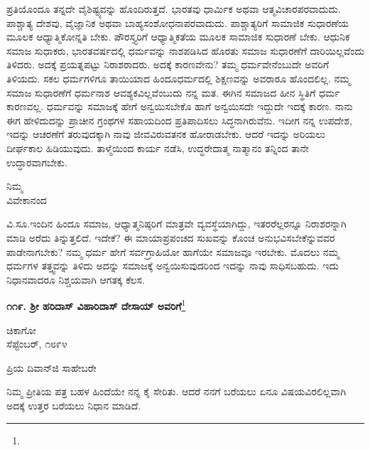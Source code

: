 ಪ್ರತಿಯೊಂದೂ ತನ್ನದೇ ವೈಶಿಷ್ಟ್ಯವನ್ನು ಹೊಂದಿರುತ್ತದೆ. ಭಾರತವು ಧಾರ್ಮಿಕ ಅಥವಾ ಆತ್ಮವಿಚಾರಪರವಾದುದು. ಪಾಶ್ಚಾತ್ಯ ದೇಶವು, ವೈಜ್ಞಾನಿಕ ಅಥವಾ ಬಾಹ್ಯಸಂಶೋಧನಾಪರವಾದುದು. ಪಾಶ್ಚಾತ್ಯರಿಗೆ ಸಾಮಾಜಿಕ ಸುಧಾರಣೆಯ ಮೂಲಕ ಆಧ್ಯಾತ್ಮಿ\break ಕೋನ್ನತಿ ಬೇಕು. ಪೌರಸ್ತ್ಯರಿಗೆ ಆಧ್ಯಾತ್ಮಿಕತೆಯ ಮೂಲಕ ಸಾಮಾಜಿಕ ಸುಧಾರಣೆ ಬೇಕು. ಆಧುನಿಕ ಸಮಾಜ ಸುಧಾಕರು, ಭಾರತವರ್ಷದಲ್ಲಿ ಧರ್ಮವನ್ನು ನಾಶಪಡಿಸಿದ ಹೊರತು ಸಮಾಜ ಸುಧಾರಣೆಗೆ ದಾರಿಯಿಲ್ಲವೆಂದು ತಿಳಿದರು. ಅದಕ್ಕೆ ಪ್ರಯತ್ನಪಟ್ಟು ನಿರಾಶರಾದರು. ಅದಕ್ಕೆ ಕಾರಣವೇನು? ತಮ್ಮ ಧರ್ಮವೇನೆಂಬುದೇ ಅವರಿಗೆ ತಿಳಿಯದು. ಸಕಲ ಧರ್ಮಗಳಿಗೂ ತಾಯಿಯಾದ ಹಿಂದೂಧರ್ಮದಲ್ಲಿ ಶಿಕ್ಷಣವನ್ನು ಅವರಾರೂ ಹೊಂದಲಿಲ್ಲ. ನಮ್ಮ ಸಮಾಜ ಸುಧಾರಣೆಗೆ ಧರ್ಮನಾಶ ಆವಶ್ಯಕವಿಲ್ಲವೆಂಬುದು ನನ್ನ ಮತ. ಈಗಿನ ಸಮಾಜದ ಹೀನ ಸ್ಥಿತಿಗೆ ಧರ್ಮ ಕಾರಣವಲ್ಲ. ಧರ್ಮವನ್ನು ಸಮಾಜಕ್ಕೆ ಹೇಗೆ ಅನ್ವಯಿಸಬೇಕೊ ಹಾಗೆ ಅನ್ವಯಿಸದೇ ಇದ್ದುದೇ ಇದಕ್ಕೆ ಕಾರಣ. ನಾನು ಈಗ ಹೇಳಿದುದನ್ನು ಪ್ರಾಚೀನ ಗ್ರಂಥಗಳ ಸಹಾಯದಿಂದ ಪ್ರತಿಪಾದಿಸಲು ಸಿದ್ಧನಾಗಿರುವೆನು. ಇದೀಗ ನನ್ನ ಉಪದೇಶ, ಇದನ್ನು ಆಚರಣೆಗೆ ತರುವುದಕ್ಕಾಗಿ ನಾವು ಜೀವವಿರುವತನಕ ಹೋರಾಡಬೇಕು. ಆದರೆ ಇದನ್ನು ಅರಿಯಲು ದೀರ್ಘಕಾಲ ಹಿಡಿಯುವುದು. ತಾಳ್ಮೆಯಿಂದ ಕಾರ್ಯ ನಡೆಸಿ, ಉದ್ಧರೇದಾತ್ಮ ನಾತ್ಮಾನಂ ತನ್ನಿಂದ ತಾನೇ ಉದ್ಧಾರವಾಗಬೇಕು.

\vspace{-0.5cm}

{\flushright
ನಿಮ್ಮ\\ವಿವೇಕಾನಂದ\par}

\vspace{0.1cm}

ವಿ.ಸೂ.\enginline{-}ಇಂದಿನ ಹಿಂದೂ ಸಮಾಜ, ಆಧ್ಯಾತ್ಮನಿಷ್ಠರಿಗೆ ಮಾತ್ರವೇ ವ್ಯವಸ್ಥೆಯಾಗಿದ್ದು, ಇತರರೆಲ್ಲರನ್ನೂ ನಿರಾಶರನ್ನಾಗಿ ಮಾಡಿ ಅರೆದು ತಿನ್ನುತ್ತಲಿದೆ. ಇದೇಕೆ? ಈ ಮಾಯಾ\break ಪ್ರಪಂಚದ ಸುಖವನ್ನು ಕೊಂಚ ಅನುಭವಿಸಬೇಕೆನ್ನುವವರ ಪಾಡೇನಾಗಬೇಕು? ನಮ್ಮ ಧರ್ಮ ಹೇಗೆ ಸರ್ವಗ್ರಾಹಿಯೋ ಹಾಗೆಯೇ ಸಮಾಜವೂ ಇರಬೇಕು. ಮೊದಲು ನಮ್ಮ ಧರ್ಮಗಳ ತತ್ತ್ವವನ್ನು ತಿಳಿದು ಅದನ್ನು ಸಮಾಜಕ್ಕೆ ಅನ್ವಯಿಸುವುದರಿಂದ ಇದನ್ನು ನಾವು ಸಾಧಿಸಬಹುದು. ಇದು ನಿಧಾನವಾದರೂ ನಿಶ್ಚಯವಾಗಿ ಆಗತಕ್ಕ ಕೆಲಸ.

\begin{center}
\textbf{೧೧೯. ಶ‍್ರೀ ಹರಿದಾಸ್ ವಿಹಾರಿದಾಸ್ ದೇಸಾಯ್ ಅವರಿಗೆ}\footnote{}
\end{center}

\vspace{-0.5cm}

\begin{flushright}
ಚಿಕಾಗೋ\\ಸೆಪ್ಟೆಂಬರ್, ೧೮೯೪
\end{flushright}

\vspace{-0.5cm}

\noindent
ಪ್ರಿಯ ದಿವಾನ್‌ಜಿ ಸಾಹೇಬರೇ\enginline{-}

ನಿಮ್ಮ ಪ್ರೀತಿಯ ಪತ್ರ ಬಹಳ ಹಿಂದೆಯೇ ನನ್ನ ಕೈ ಸೇರಿತು. ಆದರೆ ನನಗೆ ಬರೆಯಲು ಏನೂ ವಿಷಯವಿರಲಿಲ್ಲವಾಗಿ ಅದಕ್ಕೆ ಉತ್ತರ ಬರೆಯಲು ನಿಧಾನ ಮಾಡಿದೆ.

